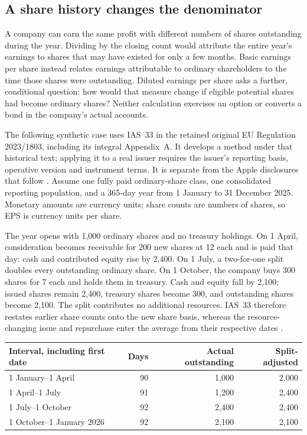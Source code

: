 \subsection{A share history changes the denominator}
\label{sec:eps-lifecycle}

A company can earn the same profit with different numbers of shares
outstanding during the year. Dividing by the closing count would attribute
the entire year's earnings to shares that may have existed for only a few
months. Basic earnings per share instead relates earnings attributable to
ordinary shareholders to the time those shares were outstanding. Diluted
earnings per share asks a further, conditional question: how would that
measure change if eligible potential shares had become ordinary shares?
Neither calculation exercises an option or converts a bond in the company's
actual accounts.

The following synthetic case uses IAS~33 in the retained original EU
Regulation 2023/1803, including its integral Appendix~A. It develops a method
under that historical text; applying it to a real issuer requires the
issuer's reporting basis, operative version and instrument terms. It is
separate from the Apple disclosures that follow
\citep[IAS~33, paragraphs 2--4, 9--12, 30--36]{eu20231803}.
Assume one fully paid ordinary-share class, one consolidated reporting
population, and a 365-day year from 1 January to 31 December 2025.
Monetary amounts are currency units; share counts are numbers of shares,
so EPS is currency units per share.

The year opens with 1,000 ordinary shares and no treasury holdings.
On 1 April, consideration becomes receivable for 200 new shares at 12
each and is paid that day: cash and contributed equity rise by 2,400.
On 1 July, a two-for-one split doubles every outstanding ordinary share.
On 1 October, the company buys 300 shares for 7 each and holds them in
treasury. Cash and equity fall by 2,100; issued shares remain 2,400,
treasury shares become 300, and outstanding shares become 2,100.
The split contributes no additional resources. IAS~33 therefore restates
earlier share counts onto the new share basis, whereas the resource-changing
issue and repurchase enter the average from their respective dates
\citep[IAS~33, paragraphs 19--21, 26--29]{eu20231803}.

\begin{center}
\begin{tabular}{lrrr}
\toprule
Interval, including first date & Days & Actual outstanding & Split-adjusted\\
\midrule
1 January--1 April & 90 & 1,000 & 2,000\\
1 April--1 July & 91 & 1,200 & 2,400\\
1 July--1 October & 92 & 2,400 & 2,400\\
1 October--1 January 2026 & 92 & 2,100 & 2,100\\
\bottomrule
\end{tabular}
\end{center}

